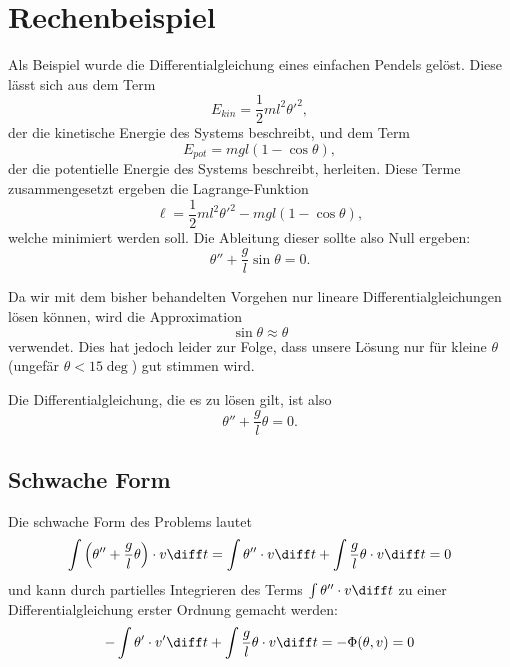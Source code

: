 %
%
%
%
\section{Rechenbeispiel\label{fem:rechenbsp}}

Als Beispiel wurde die Differentialgleichung eines einfachen Pendels gelöst. %
Diese lässt sich aus dem Term
\begin{equation}
    E_{kin} = \frac{1}{2} m l^2 {\theta'}^2,
\end{equation}
der die kinetische Energie des Systems beschreibt, und dem Term
\begin{equation}
    E_{pot} = m g l (1 - \cos \theta),
\end{equation}
der die potentielle Energie des Systems beschreibt, herleiten. 
Diese Terme zusammengesetzt ergeben die Lagrange-Funktion
\begin{equation}
    \ell = \frac{1}{2} m l^2 {\theta'}^2 - m g l (1 - \cos \theta),
\end{equation}
welche minimiert werden soll.
Die Ableitung dieser sollte also Null ergeben:
\begin{equation}
    \theta'' + \frac{g}{l} \sin \theta = 0.
\end{equation}

Da wir mit dem bisher behandelten Vorgehen nur lineare Differentialgleichungen lösen können, wird die Approximation
\begin{equation}
    \sin \theta \approx \theta
\end{equation}
verwendet. %
Dies hat jedoch leider zur Folge, dass unsere Lösung nur für kleine $\theta$ (ungefär $\theta < 15 \deg$) gut stimmen wird.

Die Differentialgleichung, die es zu lösen gilt, ist also
\begin{equation}
    \theta'' + \frac{g}{l} \theta = 0.
\end{equation}


\subsection{Schwache Form}
Die schwache Form des Problems lautet
\begin{equation}
    \int \left( \theta'' + \frac{g}{l} \theta \right) \cdot v \diff t 
    = \int \theta'' \cdot v \diff t + \int \frac{g}{l} \theta \cdot v \diff t
    = 0
\end{equation}
und kann durch partielles Integrieren des Terms $\int \theta'' \cdot v \diff t$ zu einer Differentialgleichung erster Ordnung gemacht werden:
\begin{equation}
    - \int \theta' \cdot v' \diff t + \int \frac{g}{l} \theta \cdot v \diff t = -\Phi(\theta, v) = 0
    \label{fem:rechenbsp:schwache_form}
\end{equation}


